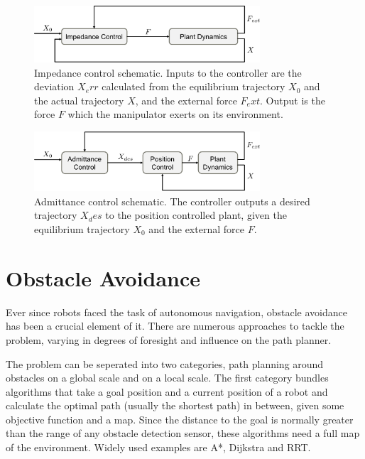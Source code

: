 \begin{figure}
   \centering
   \includegraphics[width=0.75\textwidth]{images/impedance_control_schematic.pdf}
   \caption{Impedance control schematic. Inputs to the controller are the deviation $X_err$ calculated from the equilibrium trajectory $X_0$ and the actual trajectory $X$, and the external force $F_ext$. Output is the force $F$ which the manipulator exerts on its environment.}
   \label{pics:impedance_control}
\end{figure}

\begin{figure}
   \centering
   \includegraphics[width=0.75\textwidth]{images/admittance_control_schematic.pdf}
   \caption{Admittance control schematic. The controller outputs a desired trajectory $X_des$ to the position controlled plant, given the equilibrium trajectory $X_0$ and the external force $F$.}
   \label{pics:admittance_control}
\end{figure}


\chapter{Obstacle Avoidance}
Ever since robots faced the task of autonomous navigation, obstacle avoidance has been a crucial element of it. There are numerous approaches to tackle the problem, varying in degrees of foresight and influence on the path planner.

The problem can be seperated into two categories, path planning around obstacles on a global scale and on a local scale. The first category bundles algorithms that take a goal position and a current position of a robot and calculate the optimal path (usually the shortest path) in between, given some objective function and a map. Since the distance to the goal is normally greater than the range of any obstacle detection sensor, these algorithms need a full map of the environment. Widely used examples are A*, Dijkstra and RRT.

